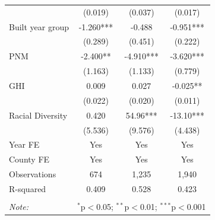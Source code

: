 \documentclass[12pt,twoside,letterpaper]{article}
\begin{document}
\begin{table}[H]
{\begin{tabular}{lccc}
 & (0.019) & (0.037) & (0.017) \\
Built year group & -1.260*** & -0.488 & -0.951*** \\
 & (0.289) & (0.451) & (0.222) \\
PNM & -2.400** & -4.910*** & -3.620*** \\
 & (1.163) & (1.133) & (0.779) \\
GHI & 0.009 & 0.027 & -0.025** \\
 & (0.022) & (0.020) & (0.011) \\
Racial Diversity & 0.420 & 54.96*** & -13.10*** \\
 & (5.536) & (9.576) & (4.438) \\ \cline{1-4}
Year FE & Yes & Yes & Yes \\
County FE & Yes & Yes & Yes \\
Observations & 674 & 1,235 & 1,940 \\
R-squared & 0.409 & 0.528 & 0.423 \\ 
\hline
\hline \\[-1.8ex]
\textit{Note:} & \multicolumn{3}{r}{$^{*}$p$<$0.05; $^{**}$p$<$0.01; $^{***}$p$<$0.001} \\
\end{tabular}}
\end{table}
\end{document}

